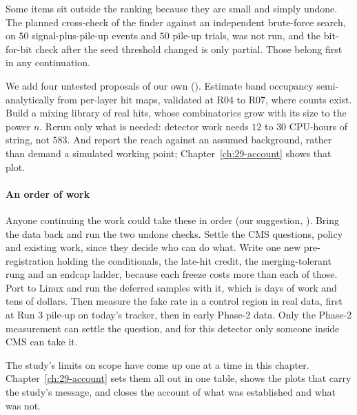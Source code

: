Some items sit outside the ranking because they are small and simply undone. The planned cross-check of the finder against an independent brute-force search, on $50$ signal-plus-pile-up events and $50$ pile-up trials, was not run, and the bit-for-bit check after the seed threshold changed is only partial. Those belong first in any continuation.

We add four untested proposals of our own (\EST). Estimate band occupancy semi-analytically from per-layer hit maps, validated at R04 to R07, where counts exist. Build a mixing library of real hits, whose combinatorics grow with its size to the power $n$. Rerun only what is needed: detector work needs $12$ to $30$ CPU-hours of string, not $583$. And report the reach against an assumed background, rather than demand a simulated working point; Chapter~\ref{ch:29-account} shows that plot.

\paragraph{An order of work}
Anyone continuing the work could take these in order (our suggestion, \EST). Bring the data back and run the two undone checks. Settle the CMS questions, policy and existing work, since they decide who can do what. Write one new pre-registration holding the conditionals, the late-hit credit, the merging-tolerant rung and an endcap ladder, because each freeze costs more than each of those. Port to Linux and run the deferred samples with it, which is days of work and tens of dollars. Then measure the fake rate in a control region in real data, first at Run 3 pile-up on today's tracker, then in early Phase-2 data. Only the Phase-2 measurement can settle the question, and for this detector only someone inside CMS can take it.

The study's limits on scope have come up one at a time in this chapter. Chapter~\ref{ch:29-account} sets them all out in one table, shows the plots that carry the study's message, and closes the account of what was established and what was not.

